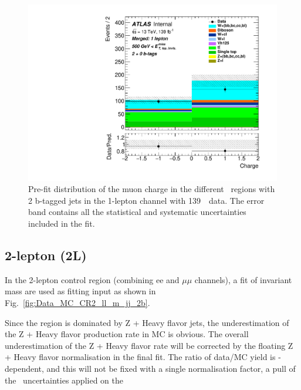 \begin{figure}[H]
  \includegraphics[width=0.46\linewidth]{chapters/c9/figures/Region_BMin500_incFat1_Fat1_incJet1_Y2015_DCR1_T20_L1_distCharge_J0_Prefit.pdf}
\caption{Pre-fit distribution of the muon charge in the different \met~regions with \\2 b-tagged jets in the 1-lepton channel with 139~\ifb~data. The error band contains all the statistical and 
    systematic uncertainties included in the fit.}
\label{fig:Data_MC_CR1_mu_charge_2b}
\end{figure}
\subsection{2-lepton (2L)}
\par In the 2-lepton control region (combining ee and $\mu\mu$ channels), a fit of invariant mass are used as fitting input as shown in Fig.~\ref{fig:Data_MC_CR2_ll_m_jj_2b}. 
 
\par Since the region is dominated by Z + Heavy flavor jets, the underestimation of the Z + Heavy flavor production rate in MC is obvious. The overall underestimation of 
the Z + Heavy flavor rate will be corrected by the floating Z + Heavy flavor normalisation in the final fit. The ratio of data/MC yield is \met-dependent, and this will not be fixed with a single normalisation factor, a pull of the \met~uncertainties applied on the

